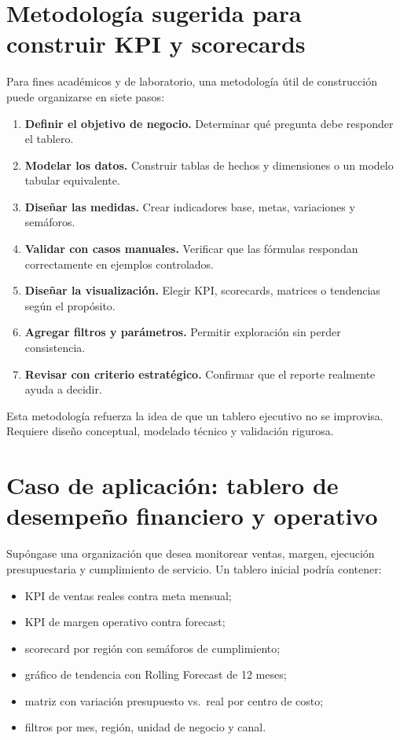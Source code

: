 \documentclass[12pt]{article}
\begin{document}
\section{Metodología sugerida para construir KPI y scorecards}
Para fines académicos y de laboratorio, una metodología útil de construcción puede organizarse en siete pasos:

\begin{enumerate}[label=\textbf{M\arabic*.}, leftmargin=*]
\item \textbf{Definir el objetivo de negocio.} Determinar qué pregunta debe responder el tablero.
\item \textbf{Modelar los datos.} Construir tablas de hechos y dimensiones o un modelo tabular equivalente.
\item \textbf{Diseñar las medidas.} Crear indicadores base, metas, variaciones y semáforos.
\item \textbf{Validar con casos manuales.} Verificar que las fórmulas respondan correctamente en ejemplos controlados.
\item \textbf{Diseñar la visualización.} Elegir KPI, scorecards, matrices o tendencias según el propósito.
\item \textbf{Agregar filtros y parámetros.} Permitir exploración sin perder consistencia.
\item \textbf{Revisar con criterio estratégico.} Confirmar que el reporte realmente ayuda a decidir.
\end{enumerate}

Esta metodología refuerza la idea de que un tablero ejecutivo no se improvisa. Requiere diseño conceptual, modelado técnico y validación rigurosa.

\section{Caso de aplicación: tablero de desempeño financiero y operativo}
Supóngase una organización que desea monitorear ventas, margen, ejecución presupuestaria y cumplimiento de servicio. Un tablero inicial podría contener:
\begin{itemize}[leftmargin=*]
\item KPI de ventas reales contra meta mensual;
\item KPI de margen operativo contra forecast;
\item scorecard por región con semáforos de cumplimiento;
\item gráfico de tendencia con Rolling Forecast de 12 meses;
\item matriz con variación presupuesto vs.\ real por centro de costo;
\item filtros por mes, región, unidad de negocio y canal.
\end{itemize}
\end{document}
